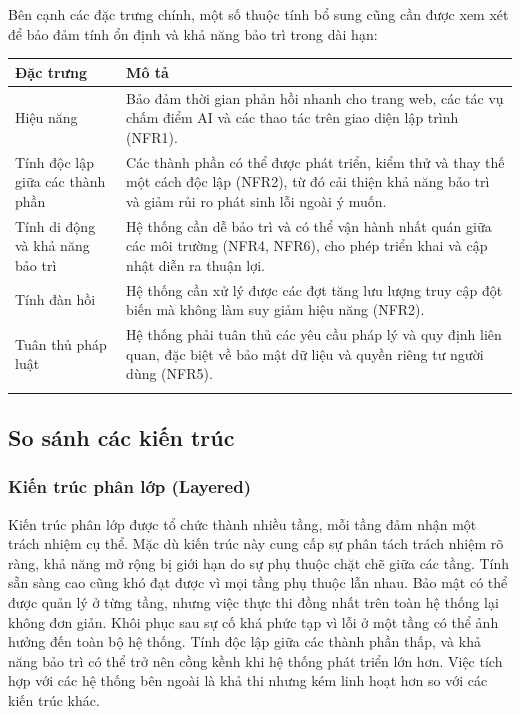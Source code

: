 Bên cạnh các đặc trưng chính, một số thuộc tính bổ sung cũng cần được xem xét để bảo đảm tính ổn định và khả năng bảo trì trong dài hạn:


{\scriptsize
\setlength{\tabcolsep}{4pt}
\renewcommand{\arraystretch}{1.5}
\begin{tabularx}{\textwidth}{|>{\centering\arraybackslash}m{4cm}|>{\arraybackslash}X|}
\hline
\textbf{Đặc trưng} & \textbf{Mô tả} \\ \hline
Hiệu năng & Bảo đảm thời gian phản hồi nhanh cho trang web, các tác vụ chấm điểm AI và các thao tác trên giao diện lập trình (NFR1). \\ \hline
Tính độc lập giữa các thành phần & Các thành phần có thể được phát triển, kiểm thử và thay thế một cách độc lập (NFR2), từ đó cải thiện khả năng bảo trì và giảm rủi ro phát sinh lỗi ngoài ý muốn. \\ \hline
Tính di động và khả năng bảo trì & Hệ thống cần dễ bảo trì và có thể vận hành nhất quán giữa các môi trường (NFR4, NFR6), cho phép triển khai và cập nhật diễn ra thuận lợi. \\ \hline
Tính đàn hồi & Hệ thống cần xử lý được các đợt tăng lưu lượng truy cập đột biến mà không làm suy giảm hiệu năng (NFR2). \\ \hline
Tuân thủ pháp luật & Hệ thống phải tuân thủ các yêu cầu pháp lý và quy định liên quan, đặc biệt về bảo mật dữ liệu và quyền riêng tư người dùng (NFR5). \\ \hline
\caption{Các đặc trưng hàm ẩn cho tính ổn định dài hạn}
\end{tabularx}}


\subsection{So sánh các kiến trúc}
\subsubsection{Kiến trúc phân lớp (Layered)}
Kiến trúc phân lớp được tổ chức thành nhiều tầng, mỗi tầng đảm nhận một trách nhiệm cụ thể. Mặc dù kiến trúc này cung cấp sự phân tách trách nhiệm rõ ràng, khả năng mở rộng bị giới hạn do sự phụ thuộc chặt chẽ giữa các tầng. Tính sẵn sàng cao cũng khó đạt được vì mọi tầng phụ thuộc lẫn nhau. Bảo mật có thể được quản lý ở từng tầng, nhưng việc thực thi đồng nhất trên toàn hệ thống lại không đơn giản. Khôi phục sau sự cố khá phức tạp vì lỗi ở một tầng có thể ảnh hưởng đến toàn bộ hệ thống. Tính độc lập giữa các thành phần thấp, và khả năng bảo trì có thể trở nên cồng kềnh khi hệ thống phát triển lớn hơn. Việc tích hợp với các hệ thống bên ngoài là khả thi nhưng kém linh hoạt hơn so với các kiến trúc khác.

